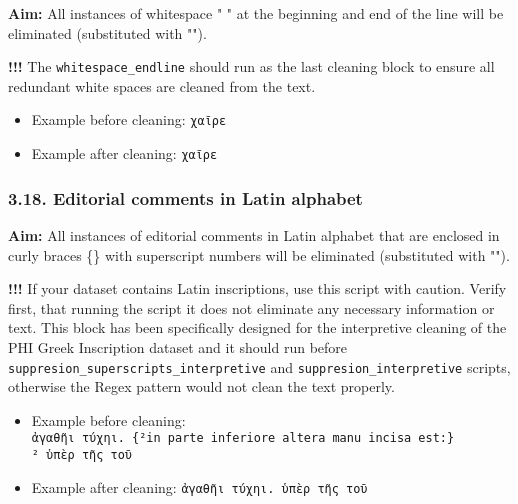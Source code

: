 \documentclass[]{article}
\newenvironment{Shaded}{\begin{snugshade}}{\end{snugshade}}
\newcommand{\CharTok}[1]{\textcolor[rgb]{0.31,0.60,0.02}{#1}}
\newcommand{\KeywordTok}[1]{\textcolor[rgb]{0.13,0.29,0.53}{\textbf{#1}}}
\newcommand{\NormalTok}[1]{#1}
\newcommand{\StringTok}[1]{\textcolor[rgb]{0.31,0.60,0.02}{#1}}
\providecommand{\tightlist}{%
  \setlength{\itemsep}{0pt}\setlength{\parskip}{0pt}}
\begin{document}
\textbf{Aim:} All instances of whitespace " " at the beginning and end
of the line will be eliminated (substituted with "").

\textbf{!!!} The \texttt{whitespace\_endline} should run as the last
cleaning block to ensure all redundant white spaces are cleaned from the
text.

\begin{itemize}
\tightlist
\item
  Example before cleaning: \texttt{χαῖρε}
\item
  Example after cleaning: \texttt{χαῖρε}
\end{itemize}

\begin{Shaded}
\end{Shaded}

\hypertarget{editorial-comments-in-latin-alphabet}{%
\subsubsection{3.18. Editorial comments in Latin
alphabet}\label{editorial-comments-in-latin-alphabet}}

\textbf{Aim:} All instances of editorial comments in Latin alphabet that
are enclosed in curly braces \{\} with superscript numbers will be
eliminated (substituted with "").

\textbf{!!!} If your dataset contains Latin inscriptions, use this
script with caution. Verify first, that running the script it does not
eliminate any necessary information or text. This block has been
specifically designed for the interpretive cleaning of the PHI Greek
Inscription dataset and it should run before
\texttt{suppresion\_superscripts\_interpretive} and
\texttt{suppresion\_interpretive} scripts, otherwise the Regex pattern
would not clean the text properly.

\begin{itemize}
\tightlist
\item
  Example before cleaning:
  \texttt{ἀγαθῆι\ τύχηι.\ \{²in\ parte\ inferiore\ altera\ manu\ incisa\ est:\}²\ ὑπὲρ\ τῆς\ τοῦ}
\item
  Example after cleaning: \texttt{ἀγαθῆι\ τύχηι.\ ὑπὲρ\ τῆς\ τοῦ}
\end{itemize}
\end{document}
